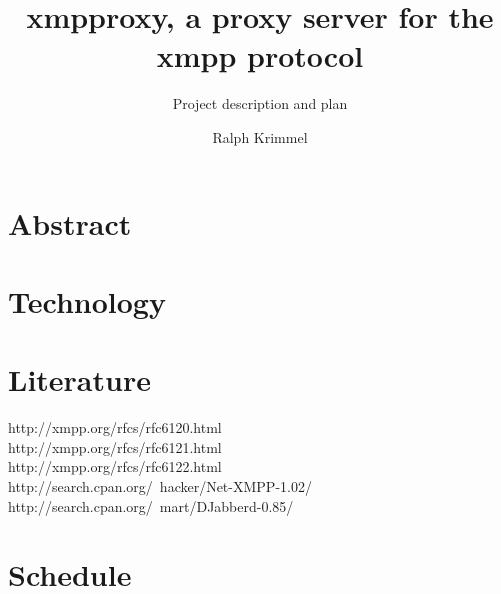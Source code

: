 \documentclass[a4paper,10pt,numbers=noendperiod]{scrartcl}
\author{Ralph Krimmel}
\title{xmpproxy, a proxy server for the xmpp protocol}
\subtitle{ Project description and plan }
\begin{document}
\maketitle{}
\thispagestyle{empty}
\newpage
\tableofcontents{}
\newpage

\section{Abstract}
\section{Technology}
\section{Literature}
http://xmpp.org/rfcs/rfc6120.html\\
http://xmpp.org/rfcs/rfc6121.html\\
http://xmpp.org/rfcs/rfc6122.html\\
http://search.cpan.org/~hacker/Net-XMPP-1.02/\\
http://search.cpan.org/~mart/DJabberd-0.85/ \\



\section{Schedule}
\end{document}
